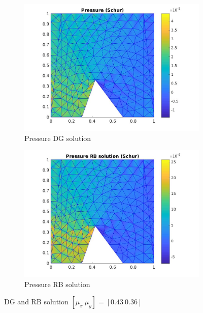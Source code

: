\documentclass[a4paper,oneside,openright,spanish,english]{book}
\begin{document}
\begin{figure}[t!]
\medskip
\begin{subfigure}{0.48\textwidth}
\includegraphics[width=\linewidth]{offline_pressure_at_43_36.jpg}
\caption{Pressure DG solution} \label{pre_dg}
\end{subfigure}\hspace*{\fill}
\begin{subfigure}{0.48\textwidth}
\includegraphics[width=\linewidth]{online_pressure_at_43_36.jpg}
\caption{Pressure RB solution} \label{pre_rb}
\end{subfigure}
\caption{DG and RB solution $[\mu_x \ \mu_y] = [0.43 \ 0.36]$} 
\label{dg_rb_solution_43_36}
\end{figure}
\end{document}
